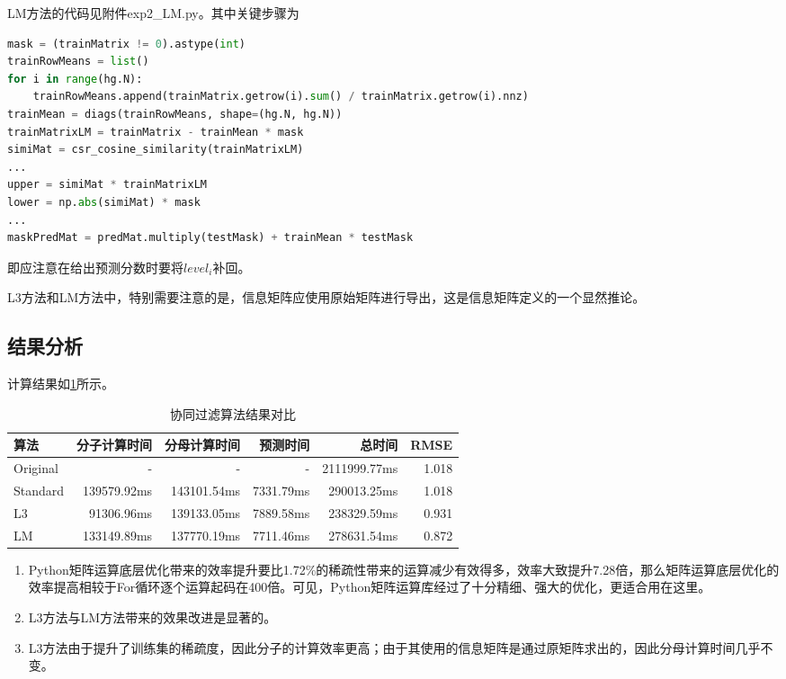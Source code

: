 \documentclass[a4paper,12pt]{article}
\begin{document}
    LM方法的代码见附件exp2\_LM.py。其中关键步骤为
    \begin{lstlisting}[language=python]
mask = (trainMatrix != 0).astype(int)
trainRowMeans = list()
for i in range(hg.N):
    trainRowMeans.append(trainMatrix.getrow(i).sum() / trainMatrix.getrow(i).nnz)
trainMean = diags(trainRowMeans, shape=(hg.N, hg.N))
trainMatrixLM = trainMatrix - trainMean * mask
simiMat = csr_cosine_similarity(trainMatrixLM)
...
upper = simiMat * trainMatrixLM
lower = np.abs(simiMat) * mask
...
maskPredMat = predMat.multiply(testMask) + trainMean * testMask
    \end{lstlisting}
    即应注意在给出预测分数时要将$level_i$补回。

    L3方法和LM方法中，特别需要注意的是，信息矩阵应使用原始矩阵进行导出，这是信息矩阵定义的一个显然推论。
    \subsection{结果分析}
    计算结果如\cref{tbl:exp2}所示。
    \begin{table}
      \centering
      \caption{协同过滤算法结果对比}
      \label{tbl:exp2}
      \begin{tabular}{lrrrrr}
        \toprule
        算法&分子计算时间&分母计算时间&预测时间&总时间&RMSE\\
        \midrule
        Original & - & - & - & 2111999.77ms & 1.018 \\
        Standard & 139579.92ms & 143101.54ms & 7331.79ms & 290013.25ms & 1.018 \\
        L3 & 91306.96ms & 139133.05ms & 7889.58ms & 238329.59ms & 0.931 \\
        LM & 133149.89ms & 137770.19ms & 7711.46ms & 278631.54ms & 0.872 \\
        \bottomrule
      \end{tabular}
    \end{table}
    \begin{enumerate}
      \item Python矩阵运算底层优化带来的效率提升要比1.72\%的稀疏性带来的运算减少有效得多，效率大致提升7.28倍，那么矩阵运算底层优化的效率提高相较于For循环逐个运算起码在400倍。可见，Python矩阵运算库经过了十分精细、强大的优化，更适合用在这里。
      \item L3方法与LM方法带来的效果改进是显著的。
      \item L3方法由于提升了训练集的稀疏度，因此分子的计算效率更高；由于其使用的信息矩阵是通过原矩阵求出的，因此分母计算时间几乎不变。
    \end{enumerate}
\end{document}
